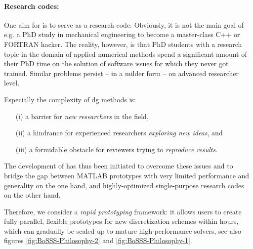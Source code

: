 \documentclass[a4paper,10pt]{report} %
\begin{document}
\paragraph{Research codes:}
One aim for \BoSSS{} is to serve as a research code: 
Obviously, it is not the main goal of e.g. a PhD study in mechanical engineering to become a 
master-class C++ or FORTRAN hacker. The reality, however, is that PhD students with a research topic in
the domain of applied numerical methods spend a significant amount of their PhD time on the solution
of software issues for which they never got trained. Similar problems persist – in a milder form – on
advanced researcher level.

Especially the complexity of \ac{dg} methods is:
\begin{itemize}
\item[(i)] a barrier for \emph{new researchers} in the field,

\item[(ii)] a hindrance for experienced researchers \emph{exploring new ideas}, and

\item[(iii)] a formidable obstacle for reviewers trying to \emph{reproduce results}.
\end{itemize}
The development of \BoSSS{} has thus been initiated to overcome these issues and to bridge the gap
between MATLAB prototypes with very limited performance and generality on the one hand, and highly-optimized single-purpose research codes on the other hand.

Therefore, we consider \BoSSS{} a \emph{rapid prototyping} framework:
it allows users to create
fully parallel, flexible prototypes for new discretization schemes within hours, which can gradually be
scaled up to mature high-performance solvers,
see also figures \ref{fig:BoSSS-Philosophy-2} and \ref{fig:BoSSS-Philosophy-1}.
\end{document}
